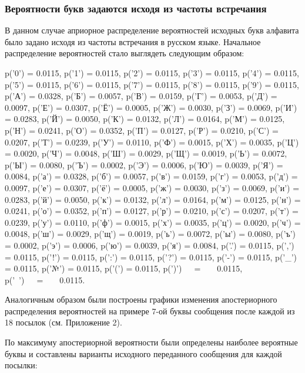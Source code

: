 \subsubsection{Вероятности букв задаются исходя из частоты встречания}

В данном случае априорное распределение вероятностей исходных букв алфавита было задано исходя из частоты встречания в русском языке. Начальное распределение вероятностей стало выглядеть следующим образом:

{ \scriptsize

\begin{multicols}{6}
\noindent p('0') = 0.0115,	p('1') = 0.0115,	p('2') = 0.0115,	p('3') = 0.0115,	p('4') = 0.0115,	p('5') = 0.0115,	p('6') = 0.0115,	p('7') = 0.0115,	p('8') = 0.0115,	p('9') = 0.0115,	p('А') = 0.0328,	p('Б') = 0.0057,	p('В') = 0.0159,	p('Г') = 0.0053,	p('Д') = 0.0097,	p('Е') = 0.0307,	p('Ё') = 0.0005,	p('Ж') = 0.0030,	p('З') = 0.0069,	p('И') = 0.0283,	p('Й') = 0.0050,	p('К') = 0.0132,	p('Л') = 0.0164,	p('М') = 0.0125,	p('Н') = 0.0241,	p('О') = 0.0352,	p('П') = 0.0127,	p('Р') = 0.0210,	p('С') = 0.0207,	p('Т') = 0.0239,	p('У') = 0.0110,	p('Ф') = 0.0015,	p('Х') = 0.0035,	p('Ц') = 0.0020,	p('Ч') = 0.0048,	p('Ш') = 0.0029,	p('Щ') = 0.0019,	p('Ь') = 0.0072,	p('Ы') = 0.0080,	p('Ъ') = 0.0002,	p('Э') = 0.0006,	p('Ю') = 0.0039,	p('Я') = 0.0084,	p('а') = 0.0328,	p('б') = 0.0057,	p('в') = 0.0159,	p('г') = 0.0053,	p('д') = 0.0097,	p('е') = 0.0307,	p('ё') = 0.0005,	p('ж') = 0.0030,	p('з') = 0.0069,	p('и') = 0.0283,	p('й') = 0.0050,	p('к') = 0.0132,	p('л') = 0.0164,	p('м') = 0.0125,	p('н') = 0.0241,	p('о') = 0.0352,	p('п') = 0.0127,	p('р') = 0.0210,	p('с') = 0.0207,	p('т') = 0.0239,	p('у') = 0.0110,	p('ф') = 0.0015,	p('х') = 0.0035,	p('ц') = 0.0020,	p('ч') = 0.0048,	p('ш') = 0.0029,	p('щ') = 0.0019,	p('ь') = 0.0072,	p('ы') = 0.0080,	p('ъ') = 0.0002,	p('э') = 0.0006,	p('ю') = 0.0039,	p('я') = 0.0084,	p('.') = 0.0115,	p(',') = 0.0115,	p('!') = 0.0115,	p(':') = 0.0115,	p('?') = 0.0115,	p('-') = 0.0115,	p('\_') = 0.0115,	p('№') = 0.0115,	p('(') = 0.0115,	p(')')\ \ \ =\ \ \ \ 0.0115,\\	p('\ ')\ \ \ =\ \ \ \ 0.0115.
\end{multicols}

}
Аналогичным образом были построены графики изменения апостериорного распределения вероятностей на примере 7-ой буквы сообщения после каждой из 18 посылок (см. Приложение 2).

По максимуму апостериорной вероятности были определены наиболее вероятные буквы и составлены варианты исходного переданного сообщения для каждой посылки:

